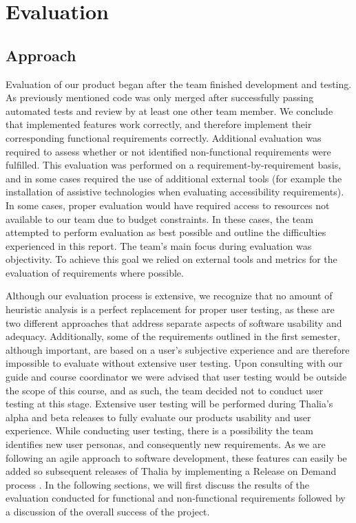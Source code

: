 \documentclass[main.tex]{subfiles}
\begin{document}
\section{Evaluation}

\subsection{Approach}
Evaluation of our product began after the team finished development and testing. As previously mentioned code was only merged after successfully passing automated tests and review by at least one other team member. We conclude that implemented features work correctly, and therefore implement their corresponding functional requirements correctly. Additional evaluation was required to assess whether or not identified non-functional requirements were fulfilled. This evaluation was performed on a requirement-by-requirement basis, and in some cases required the use of additional external tools (for example the installation of assistive technologies when evaluating accessibility requirements). In some cases, proper evaluation would have required access to resources not available to our team due to budget constraints. In these cases, the team attempted to perform evaluation as best possible and outline the difficulties experienced in this report. The team's main focus during evaluation was objectivity. To achieve this goal we relied on external tools and metrics for the evaluation of requirements where possible.

Although our evaluation process is extensive, we recognize that no amount of heuristic analysis is a perfect replacement for proper user testing, as these are two different approaches that address separate aspects of software usability and adequacy\cite{userTestingGood}. Additionally, some of the requirements outlined in the first semester, although important, are based on a user's subjective experience and are therefore impossible to evaluate without extensive user testing. Upon consulting with our guide and course coordinator we were advised that user testing would be outside the scope of this course, and as such, the team decided not to conduct user testing at this stage. Extensive user testing will be performed during Thalia’s alpha and beta releases to fully evaluate our products usability and user experience. While conducting user testing, there is a possibility the team identifies new user personas, and consequently new requirements. As we are following an agile approach to software development, these features can easily be added so subsequent releases of Thalia by implementing a Release on Demand process \cite{releaseOnDemand}.
In the following sections, we will first discuss the results of the evaluation conducted for functional and non-functional requirements followed by a discussion of the overall success of the project.
\end{document}
